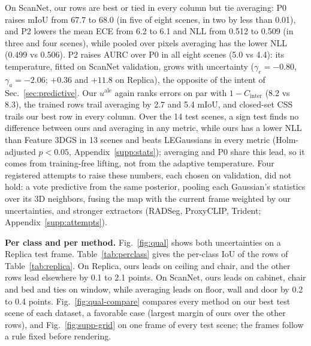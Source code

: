 \documentclass[journal]{IEEEtran}
\newcommand{\secref}[1]{Sec.~\mbox{\ref{#1}}}       %
\begin{document}
On ScanNet, our rows are best or tied in every column but tie averaging: P0 raises mIoU from 67.7 to 68.0 (in five of eight scenes, in two by less than 0.01), and P2 lowers the mean ECE from 6.2 to 6.1 and NLL from 0.512 to 0.509 (in three and four scenes), while pooled over pixels averaging has the lower NLL (0.499 vs 0.506). P2 raises AURC over P0 in all eight scenes (5.0 vs 4.4): its temperature, fitted on ScanNet validation, grows with uncertainty ($\gamma_e=-0.80$, $\gamma_a=-2.06$; $+0.36$ and $+11.8$ on Replica), the opposite of the intent of \secref{sec:predictive}. Our $u^{\mathrm{ale}}$ again ranks errors on par with $1-C_{\mathrm{inter}}$ (8.2 vs 8.3), the trained rows trail averaging by 2.7 and 5.4 mIoU, and closed-set CSS trails our best row in every column. Over the 14 test scenes, a sign test finds no difference between ours and averaging in any metric, while ours has a lower NLL than Feature 3DGS in 13 scenes and beats LEGaussians in every metric (Holm-adjusted $p<0.05$, Appendix~\ref{supp:stats}); averaging and P0 share this lead, so it comes from training-free lifting, not from the adaptive temperature. Four registered attempts to raise these numbers, each chosen on validation, did not hold: a vote predictive from the same posterior, pooling each Gaussian's statistics over its 3D neighbors, fusing the map with the current frame weighted by our uncertainties, and stronger extractors (RADSeg, ProxyCLIP, Trident; Appendix~\ref{supp:attempts}).



\textbf{Per class and per method.} Fig.~\ref{fig:qual} shows both uncertainties on a Replica test frame. Table~\ref{tab:perclass} gives the per-class IoU of the rows of Table~\ref{tab:replica}. On Replica, ours leads on ceiling and chair, and the other rows lead elsewhere by 0.1 to 2.1 points. On ScanNet, ours leads on cabinet, chair and bed and ties on window, while averaging leads on floor, wall and door by 0.2 to 0.4 points. Fig.~\ref{fig:qual-compare} compares every method on our best test scene of each dataset, a favorable case (largest margin of ours over the other rows), and Fig.~\ref{fig:supp-grid} on one frame of every test scene; the frames follow a rule fixed before rendering.
\end{document}
